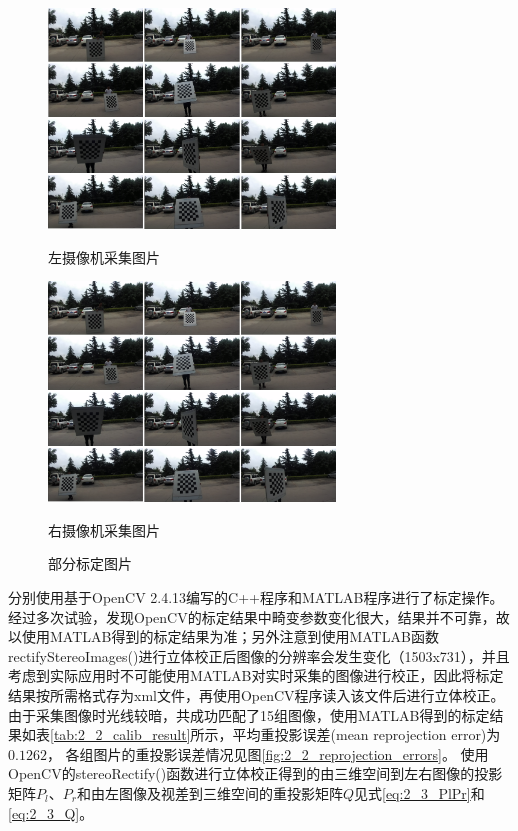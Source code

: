 \begin{figure}[!htb] %
	\centering
	\begin{minipage}[c]{0.48\textwidth}
		\centering
		\includegraphics[width=3in]{figures/2_2_calib/left_4x3}
		\centerline{\small{左摄像机采集图片}}
	\end{minipage}
	\hfill
	\begin{minipage}[c]{0.48\textwidth}
		\centering
		\includegraphics[width=3in]{figures/2_2_calib/right_4x3}
		\centerline{\small{右摄像机采集图片}}
	\end{minipage}
	\caption{部分标定图片}\label{fig:2_2_calib_imgs}
\end{figure}

分别使用基于OpenCV 2.4.13编写的C++程序和MATLAB程序进行了标定操作。经过多次试验，发现OpenCV的标定结果中畸变参数变化很大，结果并不可靠，故以使用MATLAB得到的标定结果为准；另外注意到使用MATLAB函数rectifyStereoImages()进行立体校正后图像的分辨率会发生变化（1503x731），并且考虑到实际应用时不可能使用MATLAB对实时采集的图像进行校正，因此将标定结果按所需格式存为xml文件，再使用OpenCV程序读入该文件后进行立体校正。由于采集图像时光线较暗，共成功匹配了15组图像，使用MATLAB得到的标定结果如表\ref{tab:2_2_calib_result}所示，平均重投影误差(mean reprojection error)为$0.1262$， 各组图片的重投影误差情况见图\ref{fig:2_2_reprojection_errors}。
使用OpenCV的stereoRectify()函数进行立体校正得到的由三维空间到左右图像的投影矩阵$P_l$、$P_r$和由左图像及视差到三维空间的重投影矩阵$Q$见式\ref{eq:2_3_PlPr}和\ref{eq:2_3_Q}。

